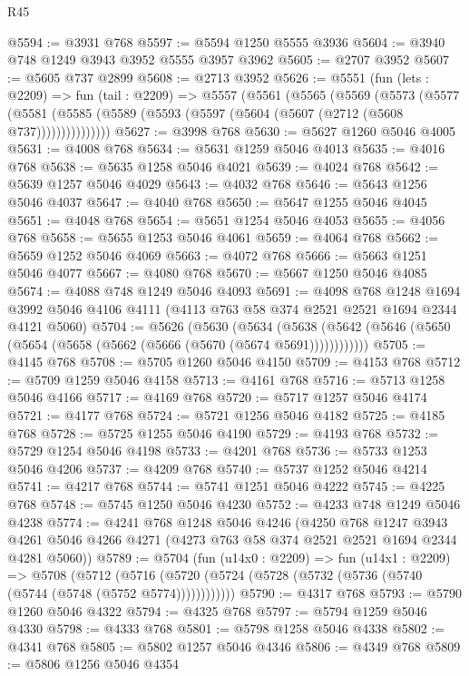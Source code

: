 \begin{lexlean}{R45}
\begin{coremodule}
@5594 := @3931 @768
@5597 := @5594 @1250 @5555 @3936
@5604 := @3940 @748 @1249 @3943 @3952 @5555 @3957 @3962
@5605 := @2707 @3952
@5607 := @5605 @737 @2899
@5608 := @2713 @3952
@5626 := @5551
    (fun (lets : @2209) =>
    fun (tail : @2209) =>
    @5557
      (@5561
        (@5565
          (@5569
            (@5573
              (@5577
                (@5581 (@5585 (@5589 (@5593 (@5597 (@5604 (@5607 (@2712 (@5608 @737)))))))))))))))
@5627 := @3998 @768
@5630 := @5627 @1260 @5046 @4005
@5631 := @4008 @768
@5634 := @5631 @1259 @5046 @4013
@5635 := @4016 @768
@5638 := @5635 @1258 @5046 @4021
@5639 := @4024 @768
@5642 := @5639 @1257 @5046 @4029
@5643 := @4032 @768
@5646 := @5643 @1256 @5046 @4037
@5647 := @4040 @768
@5650 := @5647 @1255 @5046 @4045
@5651 := @4048 @768
@5654 := @5651 @1254 @5046 @4053
@5655 := @4056 @768
@5658 := @5655 @1253 @5046 @4061
@5659 := @4064 @768
@5662 := @5659 @1252 @5046 @4069
@5663 := @4072 @768
@5666 := @5663 @1251 @5046 @4077
@5667 := @4080 @768
@5670 := @5667 @1250 @5046 @4085
@5674 := @4088 @748 @1249 @5046 @4093
@5691 := @4098
    @768
    @1248
    @1694
    @3992
    @5046
    @4106
    @4111
    (@4113 @763 @58 @374 @2521 @2521 @1694 @2344 @4121 @5060)
@5704 := @5626
    (@5630
      (@5634 (@5638 (@5642 (@5646 (@5650 (@5654 (@5658 (@5662 (@5666 (@5670 (@5674 @5691))))))))))))
@5705 := @4145 @768
@5708 := @5705 @1260 @5046 @4150
@5709 := @4153 @768
@5712 := @5709 @1259 @5046 @4158
@5713 := @4161 @768
@5716 := @5713 @1258 @5046 @4166
@5717 := @4169 @768
@5720 := @5717 @1257 @5046 @4174
@5721 := @4177 @768
@5724 := @5721 @1256 @5046 @4182
@5725 := @4185 @768
@5728 := @5725 @1255 @5046 @4190
@5729 := @4193 @768
@5732 := @5729 @1254 @5046 @4198
@5733 := @4201 @768
@5736 := @5733 @1253 @5046 @4206
@5737 := @4209 @768
@5740 := @5737 @1252 @5046 @4214
@5741 := @4217 @768
@5744 := @5741 @1251 @5046 @4222
@5745 := @4225 @768
@5748 := @5745 @1250 @5046 @4230
@5752 := @4233 @748 @1249 @5046 @4238
@5774 := @4241
    @768
    @1248
    @5046
    @4246
    (@4250
      @768
      @1247
      @3943
      @4261
      @5046
      @4266
      @4271
      (@4273 @763 @58 @374 @2521 @2521 @1694 @2344 @4281 @5060))
@5789 := @5704
    (fun (u14x0 : @2209) =>
    fun (u14x1 : @2209) =>
    @5708
      (@5712 (@5716 (@5720 (@5724 (@5728 (@5732 (@5736 (@5740 (@5744 (@5748 (@5752 @5774))))))))))))
@5790 := @4317 @768
@5793 := @5790 @1260 @5046 @4322
@5794 := @4325 @768
@5797 := @5794 @1259 @5046 @4330
@5798 := @4333 @768
@5801 := @5798 @1258 @5046 @4338
@5802 := @4341 @768
@5805 := @5802 @1257 @5046 @4346
@5806 := @4349 @768
@5809 := @5806 @1256 @5046 @4354

\end{coremodule}
\end{lexlean}
